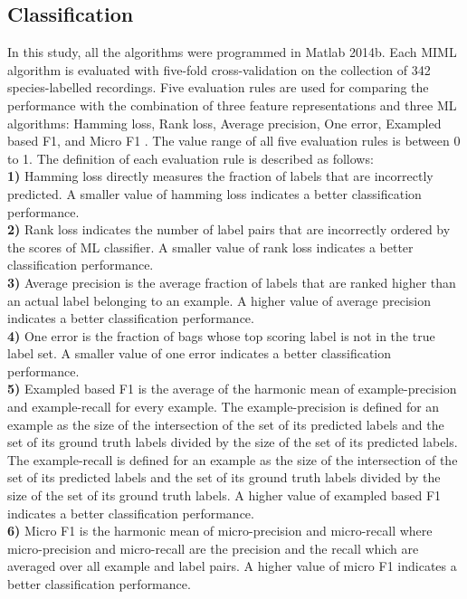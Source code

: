 \subsection{Classification}
In this study, all the algorithms were programmed in Matlab 2014b. Each MIML algorithm is evaluated with five-fold cross-validation on the collection of 342 species-labelled recordings. 
Five evaluation rules are used for comparing the performance with the combination of three feature representations and three ML algorithms: Hamming loss, Rank loss, Average precision, One error, Exampled based F1, and Micro F1 \citep{Madjarov20123084, zhou2008miml}. The value range of all five evaluation rules is between 0 to 1. The definition of each evaluation rule is described as follows:
\\
\textbf{1)} Hamming loss directly measures the fraction of labels that are incorrectly predicted. A smaller value of hamming loss indicates a better classification performance. 
\\
\textbf{2)} Rank loss indicates the number of label pairs that are incorrectly ordered by the scores of ML classifier. A smaller value of rank loss indicates a better classification performance.
\\
\textbf{3)} Average precision is the average fraction of labels that are ranked higher than an actual label belonging to an example. A higher value of average precision indicates a better classification performance.
\\
\textbf{4)} One error is the fraction of bags whose top scoring label is not in the true label set. A smaller value of one error indicates a better classification performance.
\\
\textbf{5)}
Exampled based F1 is the average of the harmonic mean of example-precision and example-recall for every example. The example-precision is defined for an example as the size of the intersection of the set of its predicted labels and the set of its ground truth labels divided by the size of the set of its predicted labels. The example-recall is defined for an example as the size of the intersection of the set of its predicted labels and the set of its ground truth labels divided by the size of the set of its ground truth labels. A higher value of exampled based F1 indicates a better classification performance.
\\
\textbf{6)}
Micro F1 is the harmonic mean of micro-precision and micro-recall where micro-precision and micro-recall are the precision and the recall which are averaged over all example and label pairs. A higher value of micro F1 indicates a better classification performance.


